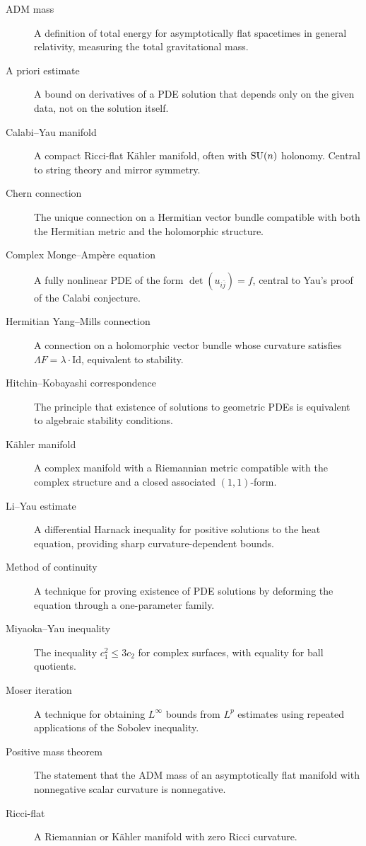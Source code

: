 \begin{description}
    \item[ADM mass] A definition of total energy for asymptotically flat spacetimes in general relativity, measuring the total gravitational mass.
    \item[A priori estimate] A bound on derivatives of a PDE solution that depends only on the given data, not on the solution itself.
    \item[Calabi--Yau manifold] A compact Ricci-flat K\"ahler manifold, often with $\operatorname{SU}(n)$ holonomy. Central to string theory and mirror symmetry.
    \item[Chern connection] The unique connection on a Hermitian vector bundle compatible with both the Hermitian metric and the holomorphic structure.
    \item[Complex Monge--Amp\`ere equation] A fully nonlinear PDE of the form $\det(u_{i\bar j}) = f$, central to Yau's proof of the Calabi conjecture.
    \item[Hermitian Yang--Mills connection] A connection on a holomorphic vector bundle whose curvature satisfies $\Lambda F = \lambda \cdot \mathrm{Id}$, equivalent to stability.
    \item[Hitchin--Kobayashi correspondence] The principle that existence of solutions to geometric PDEs is equivalent to algebraic stability conditions.
    \item[K\"ahler manifold] A complex manifold with a Riemannian metric compatible with the complex structure and a closed associated $(1,1)$-form.
    \item[Li--Yau estimate] A differential Harnack inequality for positive solutions to the heat equation, providing sharp curvature-dependent bounds.
    \item[Method of continuity] A technique for proving existence of PDE solutions by deforming the equation through a one-parameter family.
    \item[Miyaoka--Yau inequality] The inequality $c_1^2 \leq 3c_2$ for complex surfaces, with equality for ball quotients.
    \item[Moser iteration] A technique for obtaining $L^\infty$ bounds from $L^p$ estimates using repeated applications of the Sobolev inequality.
    \item[Positive mass theorem] The statement that the ADM mass of an asymptotically flat manifold with nonnegative scalar curvature is nonnegative.
    \item[Ricci-flat] A Riemannian or K\"ahler manifold with zero Ricci curvature.

\end{description}
